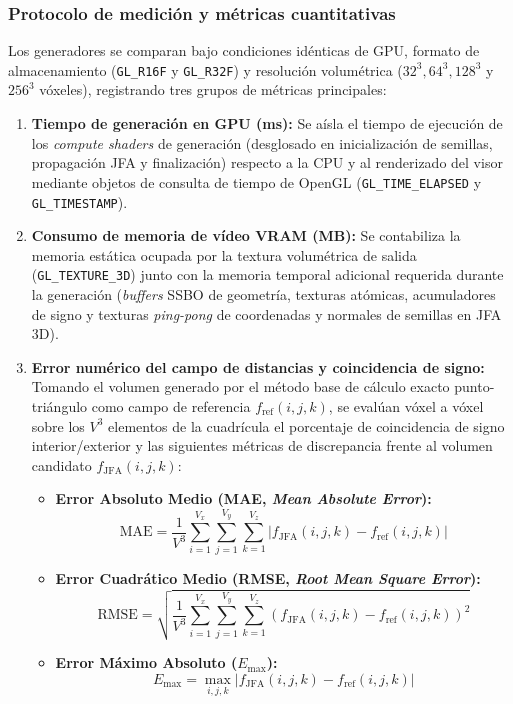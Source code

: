 \subsubsection{Protocolo de medición y métricas cuantitativas}

Los generadores se comparan bajo condiciones idénticas de GPU, formato de almacenamiento (\texttt{GL\_R16F} y \texttt{GL\_R32F}) y resolución volumétrica ($32^3, 64^3, 128^3$ y $256^3$ vóxeles), registrando tres grupos de métricas principales:

\begin{enumerate}
  \item \textbf{Tiempo de generación en GPU (ms):} Se aísla el tiempo de ejecución de los \textit{compute shaders} de generación (desglosado en inicialización de semillas, propagación JFA y finalización) respecto a la CPU y al renderizado del visor mediante objetos de consulta de tiempo de OpenGL (\texttt{GL\_TIME\_ELAPSED} y \texttt{GL\_TIMESTAMP}).
  \item \textbf{Consumo de memoria de vídeo VRAM (MB):} Se contabiliza la memoria estática ocupada por la textura volumétrica de salida (\texttt{GL\_TEXTURE\_3D}) junto con la memoria temporal adicional requerida durante la generación (\textit{buffers} SSBO de geometría, texturas atómicas, acumuladores de signo y texturas \textit{ping-pong} de coordenadas y normales de semillas en JFA 3D).
  \item \textbf{Error numérico del campo de distancias y coincidencia de signo:} Tomando el volumen generado por el método base de cálculo exacto punto-triángulo como campo de referencia $f_{\text{ref}}(i, j, k)$, se evalúan vóxel a vóxel sobre los $V^3$ elementos de la cuadrícula el porcentaje de coincidencia de signo interior/exterior y las siguientes métricas de discrepancia frente al volumen candidato $f_{\text{JFA}}(i, j, k)$:
  \begin{itemize}
    \item \textbf{Error Absoluto Medio (MAE, \textit{Mean Absolute Error}):}
    \begin{equation}
      \text{MAE} = \frac{1}{V^3} \sum_{i=1}^{V_x} \sum_{j=1}^{V_y} \sum_{k=1}^{V_z} \left| f_{\text{JFA}}(i, j, k) - f_{\text{ref}}(i, j, k) \right|
    \end{equation}
    \item \textbf{Error Cuadrático Medio (RMSE, \textit{Root Mean Square Error}):}
    \begin{equation}
      \text{RMSE} = \sqrt{\frac{1}{V^3} \sum_{i=1}^{V_x} \sum_{j=1}^{V_y} \sum_{k=1}^{V_z} \left( f_{\text{JFA}}(i, j, k) - f_{\text{ref}}(i, j, k) \right)^2}
    \end{equation}
    \item \textbf{Error Máximo Absoluto ($E_{\max}$):}
    \begin{equation}
      E_{\max} = \max_{i, j, k} \left| f_{\text{JFA}}(i, j, k) - f_{\text{ref}}(i, j, k) \right|
    \end{equation}
  \end{itemize}
\end{enumerate}

